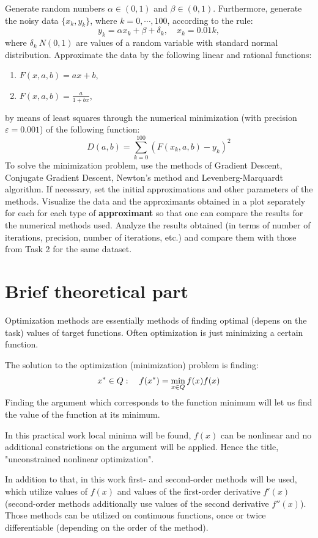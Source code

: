 \documentclass[12pt, a4paper]{article}
\begin{document}
Generate random numbers $\alpha \in (0, 1)$ and $\beta \in (0, 1)$. Furthermore, generate the noisy data $\{ x_k, y_k \}$, where $k = 0, \cdots, 100$, according to the rule:
\[ y_k = \alpha x_k + \beta + \delta_k, \quad x_k = 0.01 k, \]
where $\delta_k ~ N(0, 1)$ are values of a random variable with standard normal distribution. Approximate the data by the following linear and rational functions:
\begin{enumerate}
	\item $F(x, a, b) = ax + b$,
	\item $F(x, a, b) = \frac{a}{1+bx}$,
\end{enumerate}
by means of least squares through the numerical minimization (with precision $\varepsilon = 0.001$) of the following function:
\[ D(a, b) = \sum_{k=0}^{100} \left( F(x_k, a, b) - y_k \right)^2 \]
To solve the minimization problem, use the methods of Gradient Descent, Conjugate Gradient Descent, Newton's method and Levenberg-Marquardt algorithm. If necessary, set the initial approximations and other parameters of the methods. Visualize the data and the approximants obtained in a plot separately for each for each type of \textbf{approximant} so that one can compare the results for the numerical methods used. Analyze the results obtained (in terms of number of iterations, precision, number of iterations, etc.) and compare them with those from Task 2 for the same dataset.

\newpage

\section*{Brief theoretical part}

Optimization methods are essentially methods of finding optimal (depens on the task) values of target functions. Often optimization is just minimizing a certain function.

The solution to the optimization (minimization) problem is finding:
\[ x^* \in Q: \quad f(x^*) = \min_{x\in Q} f(x) \def \arg \min_{x\in Q} f(x) \]
Finding the argument which corresponds to the function minimum will let us find the value of the function at its minimum.

In this practical work local minima will be found, $f(x)$ can be nonlinear and no additional constrictions on the argument will be applied. Hence the title, "unconstrained nonlinear optimization".

In addition to that, in this work first- and second-order methods will be used, which utilize values of $f(x)$ and values of the first-order derivative $f'(x)$ (second-order methods additionally use values of the second derivative $f''(x)$). Those methods can be utilized on continuous functions, once or twice differentiable (depending on the order of the method).
\end{document}
